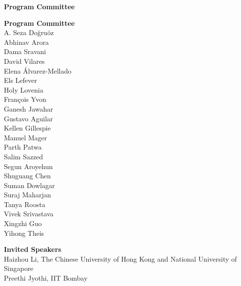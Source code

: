 \documentclass[11pt,oneside]{book}
\begin{document}
{}
\begin{center}
\Large \textbf{Program Committee}
\end{center}
\vspace*{1cm}
\begin{description}
  \item{\bf Program Committee}\vspace{2mm}\\
            A. Seza Doğruöz\\
          Abhinav Arora\\
          Dama Sravani\\
          David Vilares\\
          Elena Álvarez-Mellado\\
          Els Lefever\\
          Holy Lovenia\\
          François Yvon\\
          Ganesh Jawahar\\
          Gustavo Aguilar\\
          Kellen Gillespie\\
          Manuel Mager\\
          Parth Patwa\\
          Salim Sazzed\\
          Segun Aroyehun\\
          Shuguang Chen\\
          Suman Dowlagar\\
          Suraj Maharjan\\
          Tanya Roosta\\
          Vivek Srivastava\\
          Xingzhi Guo\\
          Yihong Theis\\
      
  \item{\bf Invited Speakers}\vspace{2mm}\\
            Haizhou Li, The Chinese University of Hong Kong and National University of Singapore\\
          Preethi Jyothi, IIT Bombay\\
      
\end{description}
\newpage
\end{document}
